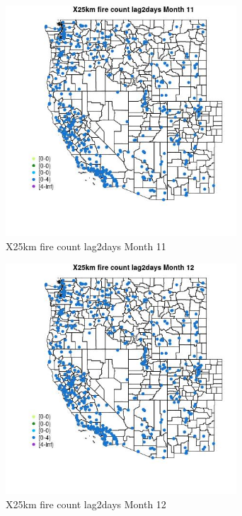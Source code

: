 \begin{figure} 
\centering  
\includegraphics[width=0.77\textwidth]{Code_Outputs/Report_ML_input_PM25_Step4_part_e_de_duplicated_aves_compiled_2019-05-14wNAs_MapObsMo11X25km_fire_count_lag2days.jpg} 
\caption{\label{fig:Report_ML_input_PM25_Step4_part_e_de_duplicated_aves_compiled_2019-05-14wNAsMapObsMo11X25km_fire_count_lag2days}X25km fire count lag2days Month 11} 
\end{figure} 
 

\begin{figure} 
\centering  
\includegraphics[width=0.77\textwidth]{Code_Outputs/Report_ML_input_PM25_Step4_part_e_de_duplicated_aves_compiled_2019-05-14wNAs_MapObsMo12X25km_fire_count_lag2days.jpg} 
\caption{\label{fig:Report_ML_input_PM25_Step4_part_e_de_duplicated_aves_compiled_2019-05-14wNAsMapObsMo12X25km_fire_count_lag2days}X25km fire count lag2days Month 12} 
\end{figure} 
 

